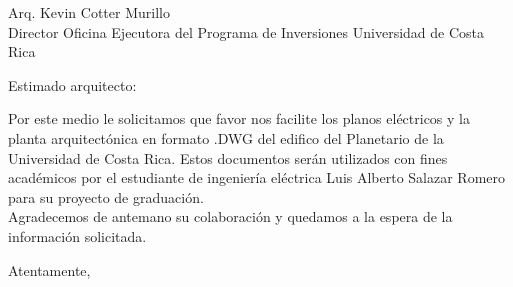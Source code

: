 \documentclass{carta}
\begin{document}
	\begin{letter}{Arq. Kevin Cotter Murillo\\ Director Oficina Ejecutora del Programa de Inversiones Universidad de Costa Rica} 
		
		\opening{Estimado arquitecto:} 
		
		Por este medio le solicitamos que favor nos facilite los planos eléctricos y la planta arquitectónica en formato .DWG del edifico del Planetario de la Universidad de Costa Rica. Estos documentos serán utilizados con fines académicos por el estudiante de ingeniería eléctrica Luis Alberto Salazar Romero para su proyecto de graduación.\\
		
		Agradecemos de antemano su colaboración y quedamos a la espera de la información solicitada.\\
		
		\vspace{0.5cm}
		
		Atentamente,
		
		
		
		\firmas
		
		
	\end{letter} 

\end{document}
